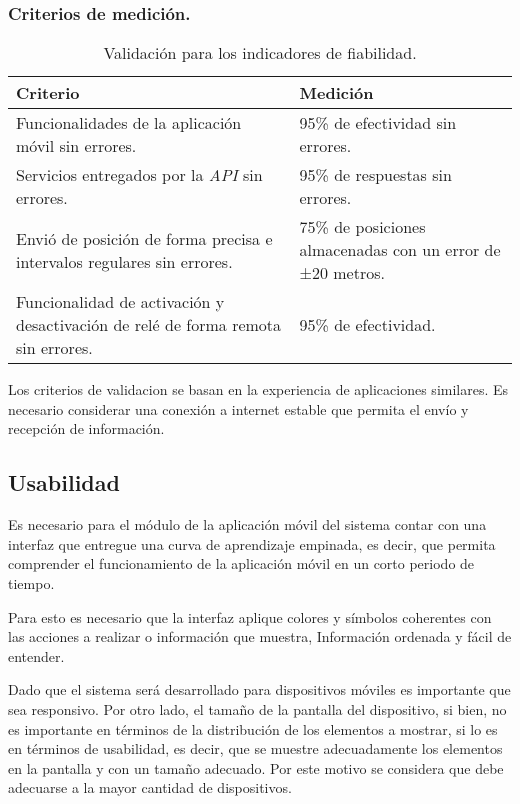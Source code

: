 \subsubsection{Criterios de medición.}

\begin{table}[H]
    \caption[Validación para los indicadores de fiabilidad.] {Validación para los indicadores de fiabilidad.}
    \label{tbl:Criterios de Validación fiabilidad}
    \begin{tabular}{|p{}|p{}|}
        \hline
        \textbf{Criterio} &  \textbf{Medición}\\
    	\hline
    	\hline
    	Funcionalidades de la aplicación móvil sin errores. & 95\% de efectividad sin errores. \\ \hline
		Servicios entregados por la \textit{API} sin errores. & 95\% de respuestas sin errores. \\ \hline
		Envió de posición de forma precisa e intervalos regulares sin errores. & 75\% de posiciones almacenadas con un error de ±20 metros. \\ \hline
		Funcionalidad de activación y desactivación de relé de forma remota sin errores. & 95\% de efectividad. \\
        \hline
    \end{tabular}
\end{table}

Los criterios de validacion se basan en la experiencia de aplicaciones similares. Es necesario considerar una conexión a internet estable que permita el envío y recepción de información.

\subsection{Usabilidad}

Es necesario para el módulo de la aplicación móvil del sistema contar con una interfaz que entregue una curva de aprendizaje empinada, es decir, que permita comprender el funcionamiento de la aplicación móvil en un corto periodo de tiempo.

Para esto es necesario que la interfaz aplique colores y símbolos coherentes con las acciones a realizar o información que muestra, Información ordenada y fácil de entender.

Dado que el sistema será desarrollado para dispositivos móviles es importante que sea responsivo. Por otro lado, el tamaño de la pantalla del dispositivo, si bien, no es importante en términos de la distribución de los elementos a mostrar, si lo es en términos de usabilidad, es decir, que se muestre adecuadamente los elementos en la pantalla y con un tamaño adecuado. Por este motivo se considera que debe adecuarse a la mayor cantidad de dispositivos.

